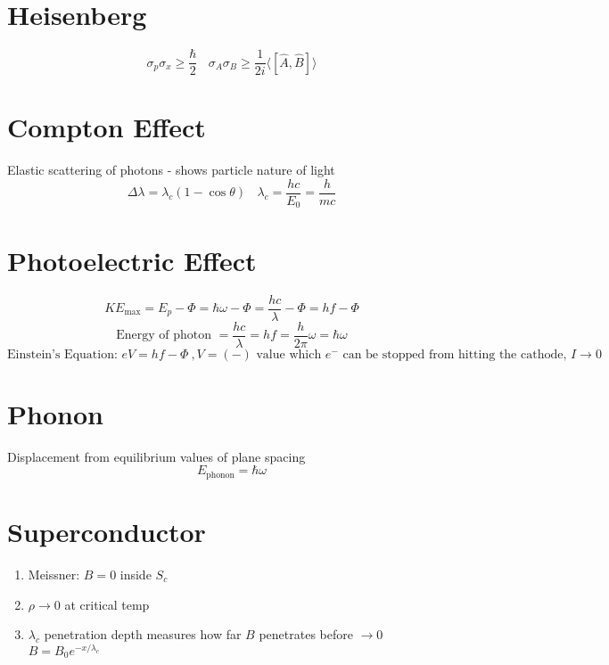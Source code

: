 \documentclass[10pt,a4paper]{article}
\begin{document}
\section{Heisenberg} %
\label{sec:heisenburg}
\begin{equation}
    \sigma_p \sigma_x \geq \frac{\hbar}{2} ~~~~ \sigma_A \sigma_B \geq \frac{1}{2i} \langle [\hat{A},\hat{B} ] \rangle
\end{equation}

\section{Compton Effect} %
\label{sec:compton_effect}
Elastic scattering of photons - shows particle nature of light
\begin{equation}
    \Delta \lambda = \lambda_c ( 1 - \cos \theta)~~~~ \lambda_c = \frac{hc}{E_0} = \frac{h}{mc}
\end{equation}

\section{Photoelectric Effect} %
\label{sec:photoelectric_effect}
\begin{equation}
    KE_{\textrm{max}} = E_p - \Phi = \hbar \omega - \Phi = \frac{hc}{\lambda}-\Phi = hf - \Phi
\end{equation}
\begin{equation}
    \textrm{Energy of photon }=\frac{hc}{\lambda} = hf = \frac{h}{2\pi}\omega = \hbar \omega
\end{equation}
\begin{equation}
    \textrm{Einstein's Equation: }eV = hf - \Phi~, V = (-)\textrm{ value which $e^-$ can be stopped from hitting the cathode, }I \rightarrow 0
\end{equation}

\section{Phonon} %
\label{sec:phonon}
Displacement from equilibrium values of plane spacing
\begin{equation}
    E_{\textrm{phonon}}=\hbar \omega
\end{equation}

\section{Superconductor} %
\label{sec:superconductor}
\begin{enumerate}
    \item Meissner: $B=0$ inside $S_c$ 
    \item $\rho \rightarrow 0$ at critical temp
    \item $\lambda_c$ penetration depth measures how far $B$ penetrates before $\rightarrow 0$\\
    $B = B_0e^{-x/\lambda_c}$
\end{enumerate}
\end{document}
